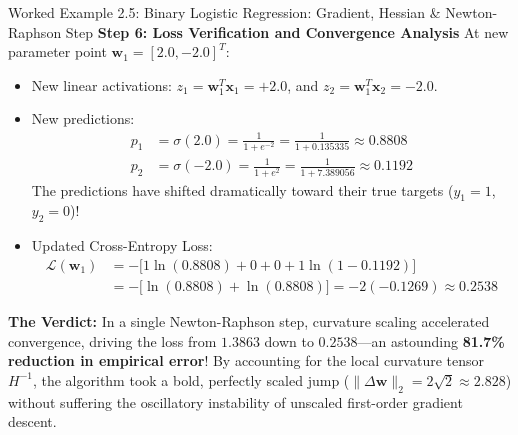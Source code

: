 \begin{examplebox}[breakable]{Worked Example 2.5: Binary Logistic Regression: Gradient, Hessian \& Newton-Raphson Step}
\textbf{Step 6: Loss Verification and Convergence Analysis}
At new parameter point $\mathbf{w}_1 = [2.0, -2.0]^T$:
\begin{itemize}
    \item New linear activations: $z_1 = \mathbf{w}_1^T \mathbf{x}_1 = +2.0$, and $z_2 = \mathbf{w}_1^T \mathbf{x}_2 = -2.0$.
    \item New predictions:
    \begin{align*}
    p_1 &= \sigma(2.0) = \frac{1}{1 + e^{-2}} = \frac{1}{1 + 0.135335} \approx \mathbf{0.8808} \\
    p_2 &= \sigma(-2.0) = \frac{1}{1 + e^{2}} = \frac{1}{1 + 7.389056} \approx \mathbf{0.1192}
    \end{align*}
    The predictions have shifted dramatically toward their true targets ($y_1 = 1$, $y_2 = 0$)!
    \item Updated Cross-Entropy Loss:
    \begin{align*}
    \mathcal{L}(\mathbf{w}_1) &= -\Big[ 1 \ln(0.8808) + 0 + 0 + 1 \ln(1 - 0.1192) \Big] \\
    &= -\Big[ \ln(0.8808) + \ln(0.8808) \Big] = -2(-0.1269) \approx \mathbf{0.2538}
    \end{align*}
\end{itemize}
\textbf{The Verdict:} In a single Newton-Raphson step, curvature scaling accelerated convergence, driving the loss from $\mathbf{1.3863}$ down to $\mathbf{0.2538}$---an astounding \textbf{81.7\% reduction in empirical error}! By accounting for the local curvature tensor $H^{-1}$, the algorithm took a bold, perfectly scaled jump ($\|\Delta \mathbf{w}\|_2 = 2\sqrt{2} \approx 2.828$) without suffering the oscillatory instability of unscaled first-order gradient descent.
\end{examplebox}

